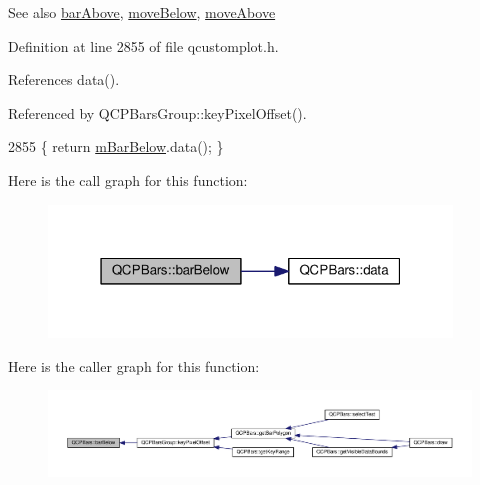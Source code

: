 \begin{DoxySeeAlso}{See also}
\hyperlink{class_q_c_p_bars_a9ca48a6577586825d85bdc1fbf410803}{bar\+Above}, \hyperlink{class_q_c_p_bars_a69fc371346980f19177c3d1ecdad78ee}{move\+Below}, \hyperlink{class_q_c_p_bars_ac22e00a6a41509538c21b04f0a57318c}{move\+Above} 
\end{DoxySeeAlso}


Definition at line 2855 of file qcustomplot.\+h.



References data().



Referenced by Q\+C\+P\+Bars\+Group\+::key\+Pixel\+Offset().


\begin{DoxyCode}
2855 \{ \textcolor{keywordflow}{return} \hyperlink{class_q_c_p_bars_ad51db970eed7e286f2753b0216fc56de}{mBarBelow}.data(); \}
\end{DoxyCode}


Here is the call graph for this function\+:\nopagebreak
\begin{figure}[H]
\begin{center}
\leavevmode
\includegraphics[width=304pt]{class_q_c_p_bars_a2c46a686cbad95f180ca3c2e88263961_cgraph}
\end{center}
\end{figure}




Here is the caller graph for this function\+:\nopagebreak
\begin{figure}[H]
\begin{center}
\leavevmode
\includegraphics[width=350pt]{class_q_c_p_bars_a2c46a686cbad95f180ca3c2e88263961_icgraph}
\end{center}
\end{figure}


\hypertarget{class_q_c_p_bars_a6d6b2b17619a0ba9c7a88bb2b90fc178}{}
